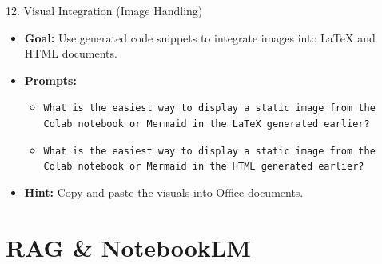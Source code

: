 \documentclass[aspectratio=169]{beamer}
\begin{document}
\begin{frame}{12. Visual Integration (Image Handling)}
\begin{itemize}
  \item \textbf{Goal:} Use generated code snippets to integrate images into LaTeX and HTML documents. 
  \item \textbf{Prompts:}
    \begin{itemize}
      \item \texttt{What is the easiest way to display a static image from the Colab notebook or Mermaid in the LaTeX generated earlier?}
      \item \texttt{What is the easiest way to display a static image from the Colab notebook or Mermaid in the HTML generated earlier?}    
    \end{itemize}
  \item \textbf{Hint:} Copy and paste the visuals into Office documents.
\end{itemize}
\end{frame}

\section{RAG \& NotebookLM}
\end{document}
